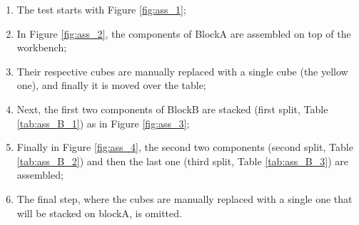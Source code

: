 \begin{enumerate}
	\item The test starts with Figure \ref{fig:ass_1};
	\item In Figure \ref{fig:ass_2}, the components of BlockA are assembled on top of the workbench;
	\item Their respective cubes are manually replaced with a single cube (the yellow one), and finally it is moved over the table;
	\item Next, the first two components of BlockB are stacked (first split, Table \ref{tab:ass_B_1}) as in Figure \ref{fig:ass_3};
	\item Finally in Figure \ref{fig:ass_4}, the second two components (second split, Table \ref{tab:ass_B_2}) and then the last one (third split, Table \ref{tab:ass_B_3}) are assembled; 
	\item The final step, where the cubes are manually replaced with a single one that will be stacked on blockA, is omitted.
\end{enumerate}
	
